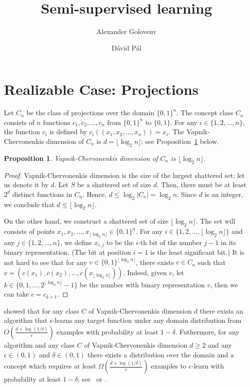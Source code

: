 \documentclass[12pt]{article}
\title{Semi-supervised learning}
\author{Alexander Golovenv \and D\'avid P\'al}
\newtheorem{proposition}{Proposition}
\begin{document}
\maketitle

\section{Realizable Case: Projections}

Let $C_n$ be the class of projections over the domain $\{0,1\}^n$. The concept
class $C_n$ consists of $n$ functions $c_1, c_2, \dots, c_n$ from $\{0,1\}^n$
to $\{0,1\}$. For any $i \in \{1,2,\dots,n\}$, the function $c_i$ is defined by $c_i((x_1, x_2,
\dots, x_n)) = x_i$. The Vapnik-Chervonenkis dimension of $C_n$ is $d = \lfloor
\log_2 n \rfloor$; see Proposition~\ref{proposition:vc-dimension-projections}
below.

\begin{proposition}
\label{proposition:vc-dimension-projections}
Vapnik-Chervonenkis dimension of $C_n$ is $\lfloor \log_2 n \rfloor$.
\end{proposition}

\begin{proof}
Vapnik-Chervonenkis dimension is the size of the largest shattered set; let us
denote it by $d$. Let $S$ be a shattered set of size $d$. Then, there must be at
least $2^d$ distinct functions in $C_n$. Hence, $d \le \log_2 |C_n| =
\log_2 n$. Since $d$ is an integer, we conclude that $d \le \lfloor \log_2 n
\rfloor$.

On the other hand, we construct a shattered set of size $\lfloor \log_2 n
\rfloor$. The set will consists of points $x_1, x_2, \dots, x_{\lfloor
\log_2 n \rfloor} \in \{0,1\}^n$. For any $i \in \{1,2,\dots,\lfloor \log_2 n \rfloor\}$
and any $j \in \{1,2,\dots,n\}$, we define $x_{i,j}$ to be the $i$-th bit of
the number $j-1$ in its binary representation. (The bit at position $i=1$ is the least significant bit.)
It is not hard to see that for any $v \in \{0,1\}^{\lfloor \log_2 n
\rfloor}$, there exists $c \in C_n$ such that $v = (c(x_1), c(x_2), \dots,
c(x_{\lfloor \log_2 n \rfloor}))$. Indeed, given $v$, let $k \in \{0,1,\dots,2^{\lfloor \log_2 n
\rfloor} - 1\}$ be the number with binary representation $v$,
then we can take $c = c_{k+1}$.
\end{proof}

\cite{Hanneke-2016} showed that for any class $C$ of Vapnik-Chervonenkis
dimension $d$ there exists an algorithm that $\epsilon$-learns any target function
under any domain distribution  from $O\left(\frac{d + \log(1/\delta)}{\epsilon}\right)$
examples with probability at least $1-\delta$. Futhermore, for any algorithm
and any class $C$ of Vapnik-Chervonenkis dimension $d \ge 2$ and any $\epsilon
\in (0,1)$ and $\delta \in (0,1)$ there exists a distribution over the domain
and a concept which requires at least $\Omega \left(\frac{d +
\log(1/\delta)}{\epsilon}\right)$ examples to $\epsilon$-learn with probability
at least $1 - \delta$; see~\cite[Theorem 5.3]{Anthony-Bartlett-1999} or
\cite{Blumer-Ehrenfeucht-Haussler-Warmuth-1989,
Ehrenfeucht-Haussler-Kearns-Valiant-1989}.
\end{document}
